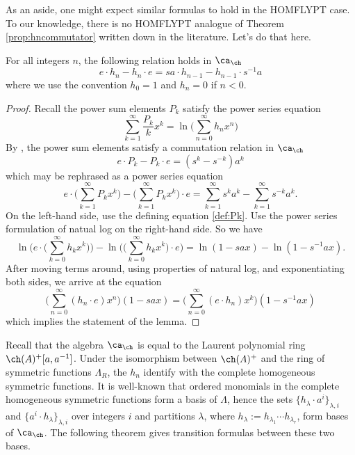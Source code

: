 As an aside, one might expect similar formulas to hold in the HOMFLYPT case. To our knowledge, there is no HOMFLYPT analogue of Theorem \ref{prop:hncommutator} written down in the literature. Let's do that here. 

\begin{lemma} \label{lem:homfly1}
For all integers $n$, the following relation holds in $\ca_\ch$
\begin{equation}
e \cdot h_n - h_n \cdot e = s a \cdot h_{n-1} - h_{n-1} \cdot  s^{-1} a
\end{equation}
where we use the convention $h_0 = 1$ and $h_n = 0$ if $n < 0$. 
\end{lemma}
\begin{proof}
Recall the power sum elements $P_k$ satisfy the power series equation
\begin{equation} \label{def:Pk}
\sum_{k=1}^\infty \frac{P_k}{k} x^k = \ln \Big( \sum_{n=0}^\infty h_n x^n \Big)
\end{equation}
By \cite[Theorem 4.2]{Mor02b}, the power sum elements satisfy a commutation relation in $\ca_\ch$
\begin{equation}
e \cdot P_k - P_k \cdot e = (s^{k} - s^{-k}) a^k
\end{equation} 
which may be rephrased as a power series equation 
\[
e \cdot \Big( \sum_{k=1}^\infty P_k x^k \Big) - \Big( \sum_{k=1}^\infty P_k x^k \Big) \cdot e = \sum_{k=1}^\infty s^k a^k - \sum_{k=1}^\infty s^{-k} a^k.
\]
On the left-hand side, use the defining equation \eqref{def:Pk}. Use the power series formulation of natual log on the right-hand side. So we have
\[
\ln \Bigg( e \cdot \Big( \sum_{k=0}^\infty h_k x^k \Big) \Bigg) - \ln \Bigg( \Big( \sum_{k=0}^\infty h_k x^k \Big) \cdot e \Bigg) = \ln ( 1 - s a x ) - \ln ( 1 - s^{-1} a x ).
\]
After moving terms around, using properties of natural log, and exponentiating both sides, we arrive at the equation
\[
\Big( \sum_{n=0}^\infty (h_n \cdot e ) x^n \Big) ( 1 - s a x ) = \Big( \sum_{n=0}^\infty ( e \cdot h_n ) x^k \Big) ( 1 - s^{-1} a x )
\]
which implies the statement of the lemma.
\end{proof}

Recall that the algebra $\ca_\ch$ is equal to the Laurent polynomial ring $\ch(A)^+[a, a^{-1}]$. Under the isomorphism between $\ch(A)^+$ and the ring of symmetric functions $\Lambda_R$, the $h_n$ identify with the complete homogeneous symmetric functions. It is well-known that ordered monomials in the complete homogeneous symmetric functions form a basis of $\Lambda$, hence the sets $\{h_\lambda \cdot a^i \}_{\lambda, i}$ and $\{a^i \cdot h_\lambda \}_{\lambda, i}$ over integers $i$ and partitions $\lambda$, where $h_\lambda := h_{\lambda_1} \cdots h_{\lambda_r}$, form bases of $\ca_\ch$. The following theorem gives transition formulas between these two bases. 

